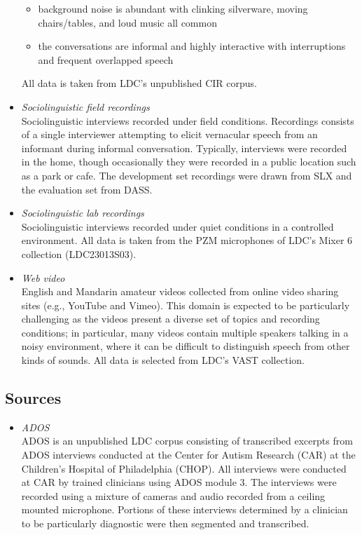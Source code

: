 \documentclass{article}
\begin{document}
\begin{appendices}
\begin{itemize}
\begin{itemize}
                    \item background noise is abundant with clinking silverware, moving chairs/tables, and loud music all common
                    \item the conversations are informal and highly interactive with interruptions and frequent overlapped speech
                \end{itemize}
            All data is taken from LDC's unpublished CIR corpus.
        \item {\it Sociolinguistic field recordings} \\
           Sociolinguistic interviews recorded under field conditions. Recordings consists of a single interviewer attempting to elicit vernacular speech from an informant during informal conversation. Typically, interviews were recorded in the home, though occasionally they were recorded in a public location such as a park or cafe. The development set recordings were drawn from SLX and the evaluation set from DASS.
        \item {\it Sociolinguistic lab recordings} \\
            Sociolinguistic interviews recorded under quiet conditions in a controlled environment. All data is taken from the PZM microphones of LDC's Mixer 6 collection (LDC23013S03).
        \item {\it Web video} \\
            English and Mandarin amateur videos collected from online video sharing sites  (e.g., YouTube and Vimeo). This domain is expected to be particularly challenging as the videos present a diverse set of topics and recording conditions; in particular,  many videos contain multiple speakers talking in a noisy environment, where it can be difficult to distinguish speech from other kinds of sounds. All data is selected from LDC's VAST collection.
    \end{itemize}


\subsection*{Sources}
    \begin{itemize}
        \item {\it ADOS} \\
            ADOS is an unpublished LDC corpus consisting of transcribed excerpts from ADOS interviews conducted at the Center for Autism Research (CAR) at the Children's Hospital of Philadelphia (CHOP). All interviews were conducted at CAR by trained clinicians using ADOS module 3. The interviews were recorded using a mixture of cameras and audio recorded from a ceiling mounted microphone. Portions of these interviews determined by a clinician to be particularly diagnostic were then segmented and transcribed.
            

\end{itemize}
\end{appendices}
\end{document}
